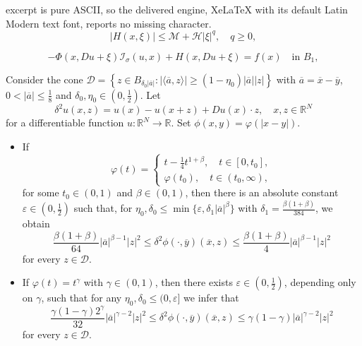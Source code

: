 \documentclass[10pt,a4paper]{amsart}
\begin{document}
excerpt is pure ASCII, so the delivered engine, XeLaTeX with its default Latin Modern text font, reports no missing character.
    \begin{equation}
    \label{2-1}
    |H(x,\xi)|\le \mathcal{M}+\mathcal{H}|\xi|^q, \quad q\ge0,
    \end{equation}

\begin{equation}
\label{main2}
-\Phi(x,Du+\xi)\mathcal{I}_\sigma(u,x)+H(x,Du+\xi)=f(x) \quad\text{in }  B_1, %
\end{equation}

\begin{lemma}
\label{lem2-1}
Consider the cone $\mathcal{D}=\left\{z\in B_{\delta_0|\overline{a}|}:|\langle\overline{a},z\rangle|\ge(1-\eta_0)|\overline{a}||z|\right\}$ with $\overline{a}=\overline{x}-\overline{y}$, $0<|\overline{a}|\le\frac{1}{8}$ and $\delta_0,\eta_0\in\left(0,\frac{1}{2}\right)$. Let
$$
\delta^2u(x,z)=u(x)-u(x+z)+Du(x)\cdot z, \quad  x,z\in\mathbb{R}^N
$$
for a differentiable function $u:\mathbb{R}^N\rightarrow\mathbb{R}$. Set $\phi(x,y)=\varphi(|x-y|)$.
\begin{itemize}
\item[(1)] If
\begin{equation*}
\varphi(t)=\begin{cases}t-\frac{1}{4}t^{1+\beta}, \quad t\in [0,t_0],\\
\varphi(t_0),  \quad t\in (t_0,\infty),
\end{cases}
\end{equation*}
for some $t_0\in(0,1)$ and $\beta\in(0,1)$, then there is an absolute constant $\varepsilon\in\left(0,\frac{1}{2}\right)$ such that, for $\eta_0,\delta_0\le\min\{\varepsilon, \delta_1|\overline{a}|^\beta\}$ with $\delta_1=\frac{\beta(1+\beta)}{384}$, we obtain
\begin{equation*}
\frac{\beta(1+\beta)}{64}|\overline{a}|^{\beta-1}|z|^2\le \delta^2\phi(\cdot,\overline{y})(\overline{x},z)\le\frac{\beta(1+\beta)}{4}|\overline{a}|^{\beta-1}|z|^2
\end{equation*}
for every $z\in \mathcal{D}$.

\item[(2)] If $\varphi(t)=t^\gamma$ with $\gamma\in(0,1)$, then there exists $\varepsilon\in\left(0,\frac{1}{2}\right)$, depending only on $\gamma$, such that for any $\eta_0,\delta_0\le(0, \varepsilon]$
we infer that
\begin{equation*}
\frac{\gamma(1-\gamma)2^\gamma}{32}|\overline{a}|^{\gamma-2}|z|^2\le \delta^2\phi(\cdot,\overline{y})(\overline{x},z)\le\gamma(1-\gamma)|\overline{a}|^{\gamma-2}|z|^2
\end{equation*}
for every $z\in \mathcal{D}$.
\end{itemize}
\end{lemma}
\end{document}
